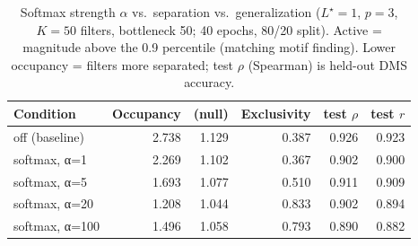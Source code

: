 \begin{table}[h]\centering
\caption{Softmax strength $\alpha$ vs.\ separation vs.\ generalization ($L^\star=1$, $p=3$, $K=50$ filters, bottleneck 50; 40 epochs, 80/20 split). Active = magnitude above the 0.9 percentile (matching motif finding). Lower occupancy = filters more separated; test $\rho$ (Spearman) is held-out DMS accuracy.}\label{tab:exp3}
\begin{tabular}{lrrrrr}\toprule
Condition & Occupancy & (null) & Exclusivity & test $\rho$ & test $r$ \\ \midrule
off (baseline) & 2.738 & 1.129 & 0.387 & 0.926 & 0.923 \\
softmax, α=1 & 2.269 & 1.102 & 0.367 & 0.902 & 0.900 \\
softmax, α=5 & 1.693 & 1.077 & 0.510 & 0.911 & 0.909 \\
softmax, α=20 & 1.208 & 1.044 & 0.833 & 0.902 & 0.894 \\
softmax, α=100 & 1.496 & 1.058 & 0.793 & 0.890 & 0.882 \\
\bottomrule\end{tabular}\end{table}
